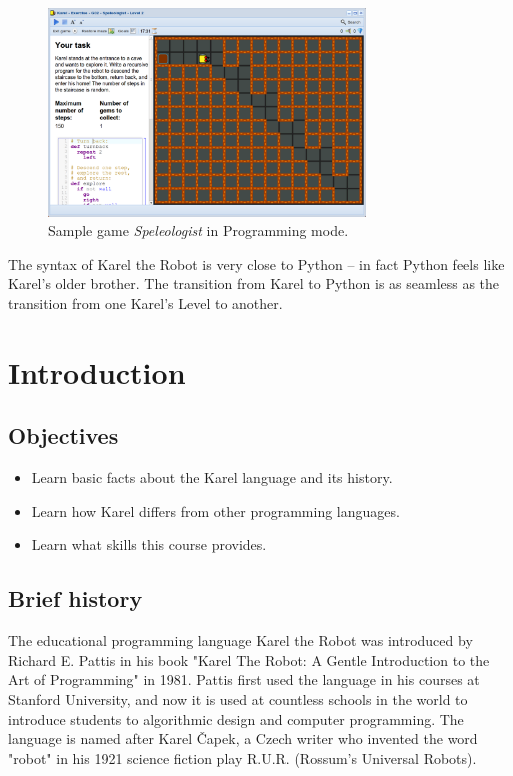 \documentclass[article,A4,12pt]{llncs}
\begin{document}
\begin{figure}[!ht]
\begin{center}
\includegraphics[width=0.75\textwidth]{img/fore-2.png}
\end{center}
\vspace{-2mm}
\caption{Sample game {\em Speleologist} in Programming mode.}
\label{fig:f2}
\vspace{-4mm}
\end{figure}
\noindent
The syntax of Karel the Robot is very close to Python -- in fact Python feels like Karel's
older brother. The transition from Karel to Python is as seamless as the transition from 
one Karel's Level to another. 

\section{Introduction}

\subsection{Objectives} 

\begin{itemize}
\item Learn basic facts about the Karel language and its history. 
\item Learn how Karel differs from other programming languages.
\item Learn what skills this course provides.
\end{itemize}

\subsection{Brief history}

The educational programming language Karel the Robot was introduced by Richard E. 
Pattis in his book "Karel The Robot: A Gentle Introduction to the Art of Programming" in 1981. 
Pattis first used the language in his courses at Stanford University, and now it is used at 
countless schools in the world to introduce students to algorithmic design and computer programming. 
The language is named after Karel \v{C}apek, a Czech writer who invented the word "robot" in his 1921 
science fiction play R.U.R. (Rossum's Universal Robots).
\end{document}
